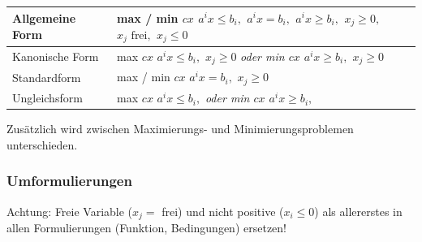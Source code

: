     \begin{tabularx}{\textwidth}{|l|X|}
      \hline
      Allgemeine Form & 
          max / min $cx$ \newline
          $a^ix \leq b_i,$ \newline
          $a^ix = b_i,$ \newline
          $a^ix \geq b_i,$ \newline
          $x_j \geq 0,$ \newline
          $x_j \text{ frei},$ \newline
          $x_j \leq 0$
          \\
      \hline
      Kanonische Form & 
          max $cx$ \newline
          $a^ix \leq b_i,$ \newline
          $x_j \geq 0$ \newline
          \em oder \em\newline
          min $cx$ \newline
          $a^ix \geq b_i,$ \newline
          $x_j \geq 0$
         \\
      \hline
      Standardform & 
        max / min $cx$ \newline
        $a^ix = b_i,$ \newline
        $x_j \geq 0$
        \\
      \hline
      Ungleichsform & 
        max $cx$ \newline
        $a^ix \leq b_i,$ \newline
        \em oder \em \newline
        min $cx$ \newline
        $a^ix \geq b_i,$
        \\
      \hline
    \end{tabularx}

    Zusätzlich wird zwischen Maximierungs- und Minimierungsproblemen unterschieden.
    
  \subsubsection{Umformulierungen }
    \label{sec:linprog_umwandlungen}
   	Achtung: Freie Variable ($x_j = $ frei) und nicht positive ($x_i \leq 0$) als allererstes in allen Formulierungen (Funktion, Bedingungen) ersetzen!
    	
